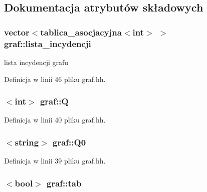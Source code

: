 \subsection{Dokumentacja atrybutów składowych}
\hypertarget{classgraf_a867b5d2b59608ad67207f4537214e006}{
\subsubsection[{lista\-\_\-incydencji}]{\setlength{\rightskip}{0pt plus 5cm}vector$<${\bf tablica\-\_\-asocjacyjna}$<$int$>$ $>$ graf\-::lista\-\_\-incydencji\hspace{0.3cm}{\ttfamily [private]}}}\label{classgraf_a867b5d2b59608ad67207f4537214e006}


lista incydencji grafu 



Definicja w linii 46 pliku graf.\-hh.

\hypertarget{classgraf_a9d7d7f9781f344e37cc41ef26e0f690a}{
\subsubsection[{Q}]{$<$int$>$ graf\-::\-Q\hspace{0.3cm}{\ttfamily [private]}}}\label{classgraf_a9d7d7f9781f344e37cc41ef26e0f690a}


Definicja w linii 40 pliku graf.\-hh.

\hypertarget{classgraf_a8dfe6c329285c5077e2d612247b0a8b0}{
\subsubsection[{Q0}]{$<$string$>$ graf\-::\-Q0\hspace{0.3cm}{\ttfamily [private]}}}\label{classgraf_a8dfe6c329285c5077e2d612247b0a8b0}


Definicja w linii 39 pliku graf.\-hh.

\hypertarget{classgraf_a563284d00331e414f9d124da73e43dd6}{
\subsubsection[{tab}]{$<$bool$>$ graf\-::tab\hspace{0.3cm}{\ttfamily [private]}}}\label{classgraf_a563284d00331e414f9d124da73e43dd6}


